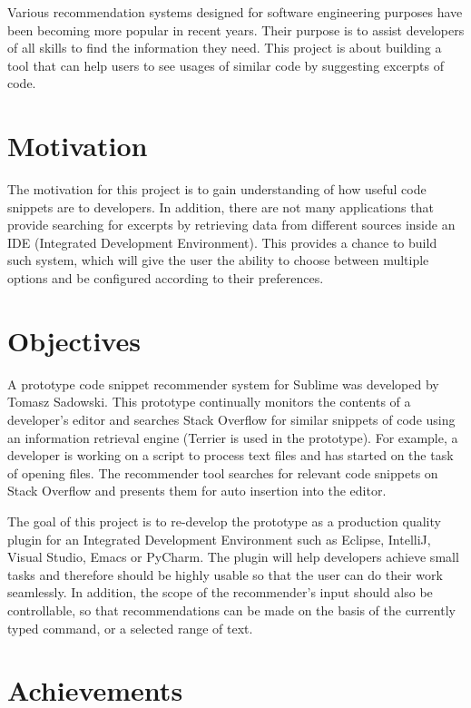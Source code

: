 \documentclass{l4proj}
\begin{document}
Various recommendation systems designed for software engineering purposes have been becoming more popular in recent years. Their purpose is to assist developers of all skills to find the information they need. This project is about building a tool that can help users to see usages of similar code by suggesting excerpts of code.

\section{Motivation}

The motivation for this project is to gain understanding of how useful code snippets are to developers. In addition, there are not many applications that provide searching for excerpts by retrieving data from different sources inside an IDE (Integrated Development Environment). This provides a chance to build such system, which will give the user the ability to choose between multiple options and be configured according to their preferences.

\section{Objectives}

A prototype code snippet recommender system for Sublime was developed by Tomasz Sadowski. This prototype continually monitors the contents of a developer's editor and searches Stack Overflow for similar snippets of code using an information retrieval engine (Terrier is used in the prototype). For example, a developer is working on a script to process text files and has started on the task of opening files. The recommender tool searches for relevant code snippets on Stack Overflow and presents them for auto insertion into the editor.

The goal of this project is to re-develop the prototype as a production quality plugin for an Integrated Development Environment such as Eclipse, IntelliJ, Visual Studio, Emacs or PyCharm. The plugin will help developers achieve small tasks and therefore should be highly usable so that the user can do their work seamlessly. In addition, the scope of the recommender's input should also be controllable, so that recommendations can be made on the basis of the currently typed command, or a selected range of text.

\section{Achievements}
\end{document}
